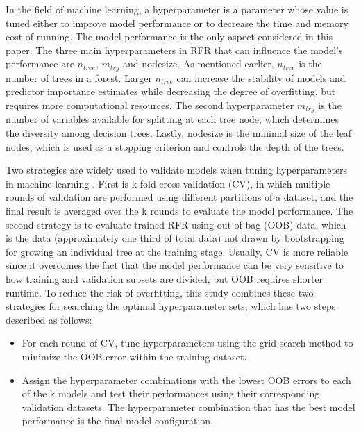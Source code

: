 In the field of machine learning, a hyperparameter is a parameter whose value is tuned either to
improve model performance or to decrease the time and memory cost of running. The model
performance is the only aspect considered in this paper. The three main hyperparameters in RFR that
can influence the model’s performance are $n_{tree}$, $m_{try}$ and nodesize. As mentioned earlier, $n_{tree}$ is the
number of trees in a forest. Larger $n_{tree}$ can increase the stability of models and predictor importance estimates while decreasing the degree of overfitting, but requires more computational resources.
The second hyperparameter $m_{try}$ is the number of variables available for splitting at each tree node,
which determines the diversity among decision trees. Lastly, nodesize is the minimal size of the leaf
nodes, which is used as a stopping criterion and controls the depth of the trees. 
\par Two strategies are widely used to validate models when tuning hyperparameters in machine
learning \cite{sathyadevan2015comparative}. First is k-fold cross validation (CV), in which multiple rounds of validation are performed
using different partitions of a dataset, and the final result is averaged over the k rounds to evaluate
the model performance. The second strategy is to evaluate trained RFR using out-of-bag (OOB) data,
which is the data (approximately one third of total data) not drawn by bootstrapping for growing an
individual tree at the training stage. Usually, CV is more reliable since it overcomes the fact that the
model performance can be very sensitive to how training and validation subsets are divided, but OOB
requires shorter runtime. To reduce the risk of overfitting, this study combines these two strategies for
searching the optimal hyperparameter sets, which has two steps described as follows:
\begin{itemize}
    \item For each round of CV, tune hyperparameters using the grid search method to minimize the OOB
error within the training dataset.
    \item Assign the hyperparameter combinations with the lowest OOB errors to each of the k models
and test their performances using their corresponding validation datasets. The hyperparameter
combination that has the best model performance is the final model configuration.
\end{itemize}

